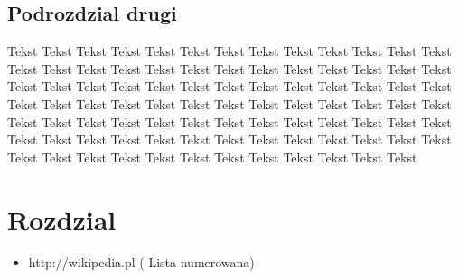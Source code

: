 \documentclass[11pt]{article} %
\begin{document}
\subsection{Podrozdzial drugi}
Tekst Tekst Tekst Tekst Tekst Tekst Tekst Tekst Tekst Tekst Tekst Tekst Tekst Tekst Tekst Tekst Tekst Tekst Tekst Tekst Tekst Tekst Tekst Tekst Tekst Tekst Tekst Tekst Tekst Tekst Tekst Tekst Tekst Tekst Tekst Tekst Tekst Tekst Tekst Tekst Tekst Tekst Tekst Tekst Tekst Tekst Tekst Tekst Tekst Tekst Tekst Tekst Tekst Tekst Tekst Tekst Tekst Tekst Tekst Tekst Tekst Tekst Tekst Tekst Tekst Tekst Tekst Tekst Tekst Tekst Tekst Tekst Tekst Tekst Tekst Tekst Tekst Tekst Tekst Tekst Tekst Tekst Tekst Tekst Tekst Tekst Tekst Tekst Tekst Tekst 


\section{Rozdzial}
    \begin{itemize}
      \item http://wikipedia.pl ( Lista numerowana)
    \end{itemize}
\end{document}
